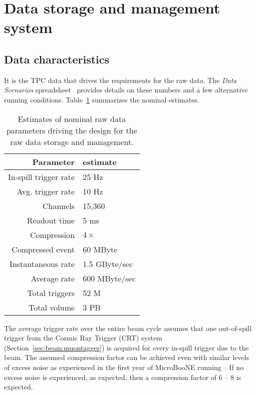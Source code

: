 \section{Data storage and management system}

\subsection{Data characteristics}

It is the TPC data that drives the requirements for the raw \pdsp data.
The \textit{\pdsp Data Scenarios} spreadsheet~\cite{data_spreadsheet}  %
provides details on these %
numbers and a few alternative running conditions.
Table~\ref{tab:goldi} summarizes the nominal estimates.

\begin{table}[h]
  \centering
  \begin{tabular}[h]{|r|l|}
    \hline
    Parameter & estimate  \\
    \hline
    In-spill trigger rate & 25 Hz \\
    Avg. trigger rate & 10 Hz \\
    Channels & 15,360 \\
    Readout time & 5 ms \\
    Compression & $4\times$ \\
    \hline
    Compressed event & 60 MByte  \\
    Instantaneous rate & 1.5 GByte/sec \\
    Average rate & 600 MByte/sec \\
    \hline
    Total triggers & 52 M \\
    Total volume & 3 PB  \\
    \hline
  \end{tabular}
  \caption{Estimates of nominal raw data parameters driving the design for the raw data storage and management.}
  \label{tab:goldi}
\end{table}

The average trigger rate over the entire beam cycle assumes that one
out-of-spill trigger from the Cosmic Ray Trigger (CRT) system (Section~\ref{sec:beam:muontagger}) 
is acquired
for every in-spill trigger due to the beam.  The assumed compression
factor can be achieved even with similar levels of excess noise as
experienced in the first year of MicroBooNE running~\cite{docdb2089}.
If no excess noise is experienced, as expected, then a compression factor
of 6 -- 8 is expected.  


